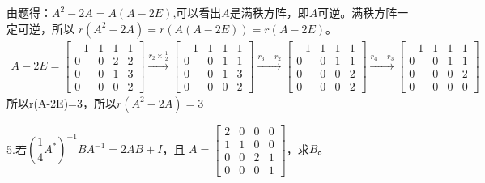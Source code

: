 \documentclass{article}
\begin{document}
\begin{jie}
由题得：$A^{2}-2A=A(A-2E)$,可以看出$A$是满秩方阵，即$A$可逆。\textcolor[rgb]{1.00,0.00,0.00}{满秩方阵一定可逆}，所以
$r(A^{2}-2A)=r(A(A-2E))=r(A-2E)$。
\begin{align*}
A-2E=
\begin{bmatrix}
-1 & 1 & 1 & 1\\
0 & 0 & 2 & 2\\
0 & 0 & 1 & 3\\
0 & 0 & 0 & 2
\end{bmatrix}
\xrightarrow{r_{2}\times\frac{1}{2}}
{
\begin{bmatrix}
-1 & 1 & 1 & 1\\
0 & 0 & 1 & 1\\
0 & 0 & 1 & 3\\
0 & 0 & 0 & 2
\end{bmatrix}
}\xrightarrow{r_{3}-r_{2}}
{
\begin{bmatrix}
-1 & 1 & 1 & 1\\
0 & 0 & 1 & 1\\
0 & 0 & 0 & 2\\
0 & 0 & 0 & 2
\end{bmatrix}
}\xrightarrow{r_{4}-r_{3}}
{
\begin{bmatrix}
-1 & 1 & 1 & 1\\
0 & 0 & 1 & 1\\
0 & 0 & 0 & 2\\
0 & 0 & 0 & 0
\end{bmatrix}
}
\end{align*}
所以r(A-2E)=3，所以$r(A^{2}-2A)=3$
\end{jie}

5.若$\left(\dfrac{1}{4}A^{*}\right)^{-1}BA^{-1}=2AB+I$，且
$A=
\begin{bmatrix}
  2 & 0& 0 & 0 \\
  1 & 1 & 0& 0 \\
  0 & 0 & 2& 1\\
   0& 0 &0 &1
\end{bmatrix}
$，求$B$。
\end{document}
